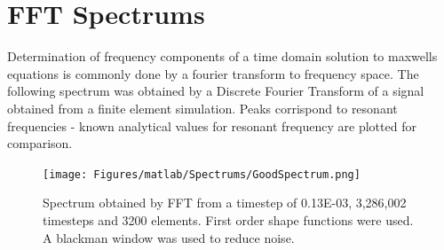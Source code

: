 



\section{FFT Spectrums}

Determination of frequency components of a time domain solution to maxwells equations is commonly done by a fourier transform to frequency space. The following spectrum was obtained by a Discrete Fourier Transform of a signal obtained from a finite element simulation. Peaks corrispond to resonant frequencies - known analytical values for resonant frequency are plotted for comparison.

\begin{figure}
\texttt{[image: Figures/matlab/Spectrums/GoodSpectrum.png]}
\caption{Spectrum obtained by FFT from a timestep of 0.13E-03, 3,286,002 timesteps and 3200 elements. First order shape functions were used. A blackman window was used to reduce noise.}
\label{Spectrum1}
\end{figure}

% 
% 
% 


